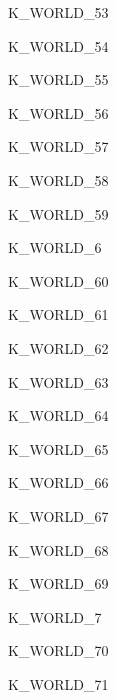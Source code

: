 \begin{datadesc}{K_WORLD_53}
\end{datadesc}
\begin{datadesc}{K_WORLD_54}
\end{datadesc}
\begin{datadesc}{K_WORLD_55}
\end{datadesc}
\begin{datadesc}{K_WORLD_56}
\end{datadesc}
\begin{datadesc}{K_WORLD_57}
\end{datadesc}
\begin{datadesc}{K_WORLD_58}
\end{datadesc}
\begin{datadesc}{K_WORLD_59}
\end{datadesc}
\begin{datadesc}{K_WORLD_6}
\end{datadesc}
\begin{datadesc}{K_WORLD_60}
\end{datadesc}
\begin{datadesc}{K_WORLD_61}
\end{datadesc}
\begin{datadesc}{K_WORLD_62}
\end{datadesc}
\begin{datadesc}{K_WORLD_63}
\end{datadesc}
\begin{datadesc}{K_WORLD_64}
\end{datadesc}
\begin{datadesc}{K_WORLD_65}
\end{datadesc}
\begin{datadesc}{K_WORLD_66}
\end{datadesc}
\begin{datadesc}{K_WORLD_67}
\end{datadesc}
\begin{datadesc}{K_WORLD_68}
\end{datadesc}
\begin{datadesc}{K_WORLD_69}
\end{datadesc}
\begin{datadesc}{K_WORLD_7}
\end{datadesc}
\begin{datadesc}{K_WORLD_70}
\end{datadesc}
\begin{datadesc}{K_WORLD_71}
\end{datadesc}
